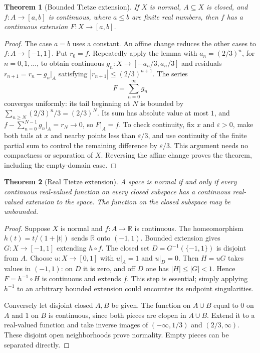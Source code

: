 \documentclass[11pt,oneside,openany]{book}
\newtheorem{theorem}{Theorem}[chapter]
\theoremstyle{definition}
\theoremstyle{remark}
\newcommand{\R}{\mathbb R}\newcommand{\C}{\mathbb C}
\newcommand{\eps}{\varepsilon}
\begin{document}
\begin{theorem}[Bounded Tietze extension]\label{d10:07:tietze-bounded}
If $X$ is normal, $A\subseteq X$ is closed, and $f:A\to[a,b]$ is continuous, where $a\leq b$ are finite real numbers, then $f$ has a continuous extension $F:X\to[a,b]$.
\end{theorem}
\begin{proof}
The case $a=b$ uses a constant. An affine change reduces the other cases to $f:A\to[-1,1]$. Put $r_0=f$. Repeatedly apply the lemma with $a_n=(2/3)^n$, for $n=0,1,\ldots$, to obtain continuous $g_n:X\to[-a_n/3,a_n/3]$ and residuals $r_{n+1}=r_n-g_n|_A$ satisfying $|r_{n+1}|\leq(2/3)^{n+1}$. The series
\[
 F=\sum_{n=0}^{\infty}g_n
\]
converges uniformly: its tail beginning at $N$ is bounded by $\sum_{n\geq N}(2/3)^n/3=(2/3)^N$. Its sum has absolute value at most $1$, and $f-\sum_{n=0}^{N-1}g_n|_A=r_N\to0$, so $F|_A=f$. To check continuity, fix $x$ and $\eps>0$, make both tails at $x$ and nearby points less than $\eps/3$, and use continuity of the finite partial sum to control the remaining difference by $\eps/3$. This argument needs no compactness or separation of $X$. Reversing the affine change proves the theorem, including the empty-domain case.
\end{proof}

\begin{theorem}[Real Tietze extension]\label{d10:07:tietze-real}
A space is normal if and only if every continuous real-valued function on every closed subspace has a continuous real-valued extension to the space. The function on the closed subspace may be unbounded.
\end{theorem}
\begin{proof}
Suppose $X$ is normal and $f:A\to\R$ is continuous. The homeomorphism $h(t)=t/(1+|t|)$ sends $\R$ onto $(-1,1)$. Bounded extension gives $G:X\to[-1,1]$ extending $h\circ f$. The closed set $D=G^{-1}(\{-1,1\})$ is disjoint from $A$. Choose $u:X\to[0,1]$ with $u|_A=1$ and $u|_D=0$. Then $H=uG$ takes values in $(-1,1)$: on $D$ it is zero, and off $D$ one has $|H|\leq|G|<1$. Hence $F=h^{-1}\circ H$ is continuous and extends $f$. This step is essential; simply applying $h^{-1}$ to an arbitrary bounded extension could encounter its endpoint singularities.

Conversely let disjoint closed $A,B$ be given. The function on $A\cup B$ equal to $0$ on $A$ and $1$ on $B$ is continuous, since both pieces are clopen in $A\cup B$. Extend it to a real-valued function and take inverse images of $(-\infty,1/3)$ and $(2/3,\infty)$. These disjoint open neighborhoods prove normality. Empty pieces can be separated directly.
\end{proof}
\end{document}
